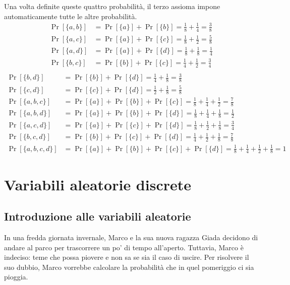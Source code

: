 \documentclass[a4paper, 12pt]{report}
\begin{document}
    Una volta definite queste quattro probabilità, il terzo assioma impone automaticamente tutte le altre probabilità.
    \[\begin{split}
        \Pr[\{a,b\}] &= \Pr[\{a\}] + \Pr[\{b\}] = \frac{1}{8} + \frac{1}{4} = \frac{3}{8} \\
        \Pr[\{a,c\}] &= \Pr[\{a\}] + \Pr[\{c\}] = \frac{1}{8} + \frac{1}{2} = \frac{5}{8} \\
        \Pr[\{a,d\}] &= \Pr[\{a\}] + \Pr[\{d\}] = \frac{1}{8} + \frac{1}{8} = \frac{1}{4} \\
        \Pr[\{b,c\}] &= \Pr[\{b\}] + \Pr[\{c\}] = \frac{1}{4} + \frac{1}{2} = \frac{3}{4} \\
    \end{split}\]
    \[\begin{split}
        \Pr[\{b,d\}] &= \Pr[\{b\}] + \Pr[\{d\}] = \frac{1}{4} + \frac{1}{8} = \frac{3}{8} \\
        \Pr[\{c,d\}] &= \Pr[\{c\}] + \Pr[\{d\}] = \frac{1}{2} + \frac{1}{8} = \frac{5}{8} \\
        \Pr[\{a,b,c\}] &= \Pr[\{a\}] + \Pr[\{b\}] + \Pr[\{c\}] = \frac{1}{8} + \frac{1}{4} + \frac{1}{2} = \frac{7}{8} \\
        \Pr[\{a,b,d\}] &= \Pr[\{a\}] + \Pr[\{b\}] + \Pr[\{d\}] = \frac{1}{8} + \frac{1}{4} + \frac{1}{8} = \frac{1}{2} \\
        \Pr[\{a,c,d\}] &= \Pr[\{a\}] + \Pr[\{c\}] + \Pr[\{d\}] = \frac{1}{8} + \frac{1}{2} + \frac{1}{8} = \frac{3}{4} \\
        \Pr[\{b,c,d\}] &= \Pr[\{b\}] + \Pr[\{c\}] + \Pr[\{d\}] = \frac{1}{4} + \frac{1}{2} + \frac{1}{8} = \frac{7}{8} \\
        \Pr[\{a,b,c,d\}] &= \Pr[\{a\}] + \Pr[\{b\}] + \Pr[\{c\}] + \Pr[\{d\}] = \frac{1}{8} + \frac{1}{4} + \frac{1}{2} + \frac{1}{8} = 1
    \end{split}\]

    \chapter{Variabili aleatorie discrete}
    \label{disc_var}

    \section{Introduzione alle variabili aleatorie}

    In una fredda giornata invernale, Marco e la sua nuova ragazza Giada decidono di andare al parco per trascorrere un po' di tempo all'aperto. Tuttavia, Marco è indeciso: teme che possa piovere e non sa se sia il caso di uscire. Per risolvere il suo dubbio, Marco vorrebbe calcolare la probabilità che in quel pomeriggio ci sia pioggia.
\end{document}

